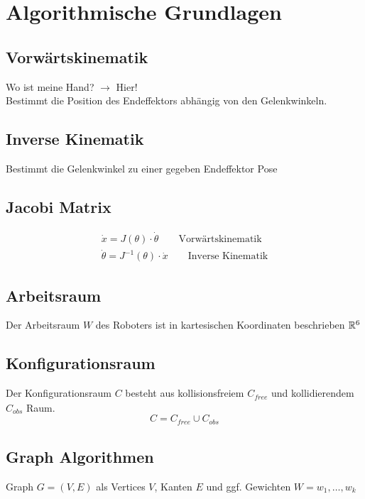 

\section{Algorithmische Grundlagen}
\label{sec:algorithmtische_grundlagen}

\subsection{Vorwärtskinematik}
\label{sub:vorwaertskinematik}
Wo ist meine Hand? \(\rightarrow\) Hier!\\

Bestimmt die Position des Endeffektors abhängig von den Gelenkwinkeln.

\subsection{Inverse Kinematik}
\label{sub:inverse_kinematik}
Bestimmt die Gelenkwinkel zu einer gegeben Endeffektor Pose

\subsection{Jacobi Matrix}
\label{sub:jacobi_matrix}
\begin{align*}
  \dot{x} = J(\theta) \cdot \dot{\theta} \qquad \text{Vorwärtskinematik}\\
  \dot{\theta} = J^{-1} (\theta) \cdot \dot{x} \qquad \text{Inverse Kinematik}
\end{align*}

\subsection{Arbeitsraum}
\label{sub:arbeitsraum}
Der Arbeitsraum \(W\) des Roboters ist in kartesischen Koordinaten beschrieben \(\mathbb{R}^6\)

\subsection{Konfigurationsraum}
\label{sub:konfigurationsraum}
Der Konfigurationsraum \(C\) besteht aus kollisionsfreiem \(C_{\mathit{free}}\) und kollidierendem \(C_\mathit{obs}\) Raum.
\[C = C_\mathit{free} \cup C_\mathit{obs}\]

\subsection{Graph Algorithmen}
\label{sub:graph_algorithmen}
Graph \(G = (V, E)\) als Vertices \(V\), Kanten \(E\) und ggf. Gewichten \(W = {w_1, \ldots, w_k}\)

